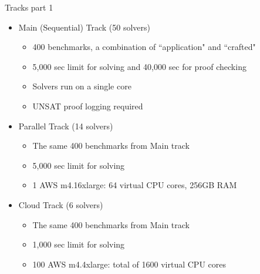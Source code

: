 \documentclass{beamer}
\begin{document}
\begin{frame}{Tracks part 1}
\begin{itemize}
\item Main (Sequential) Track (50 solvers)
\begin{itemize}
\item 400 benchmarks, a combination of ``application" and ``crafted"
\item 5,000 sec limit for solving and 40,000 sec for proof checking
\item Solvers run on a single core
\item UNSAT proof logging required
\end{itemize}
\pause
\medskip
\item Parallel Track (14 solvers)
\begin{itemize}
\item The same 400 benchmarks from Main track
\item 5,000 sec limit for solving
\item 1 AWS m4.16xlarge: 64 virtual CPU cores, 256GB RAM
\end{itemize}
\pause
\medskip
\item Cloud Track (6 solvers)
\begin{itemize}
\item The same 400 benchmarks from Main track
\item 1,000 sec limit for solving
\item 100 AWS m4.4xlarge: total of 1600 virtual CPU cores
\end{itemize}
\end{itemize}
\end{frame}
\end{document}
